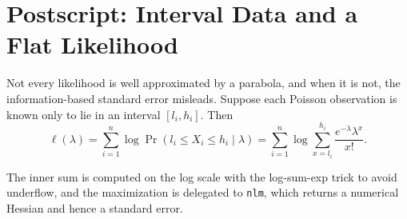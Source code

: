\documentclass[
  letterpaper,
  DIV=11,
  numbers=noendperiod]{scrreprt}
\begin{document}
\section{Postscript: Interval Data and a Flat
Likelihood}\label{postscript-interval-data-and-a-flat-likelihood}

Not every likelihood is well approximated by a parabola, and when it is
not, the information-based standard error misleads. Suppose each Poisson
observation is known only to lie in an interval \([l_i, h_i]\). Then
\[\ell(\lambda) = \sum_{i=1}^{n} \log \Pr\left(l_i \le X_i \le h_i \mid \lambda\right)
= \sum_{i=1}^{n} \log \sum_{x = l_i}^{h_i} \frac{e^{-\lambda}\lambda^{x}}{x!} .\]

The inner sum is computed on the log scale with the log-sum-exp trick to
avoid underflow, and the maximization is delegated to \texttt{nlm},
which returns a numerical Hessian and hence a standard error.
\end{document}
